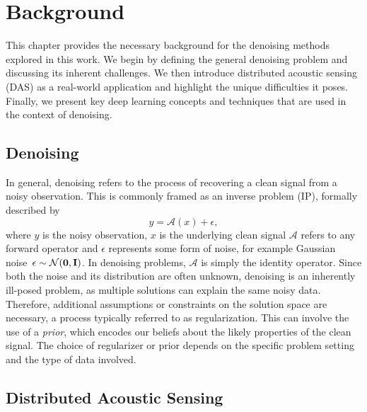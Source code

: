 \chapter{Background}

This chapter provides the necessary background for the denoising methods explored in this work.
We begin by defining the general denoising problem and discussing its inherent challenges.
We then introduce distributed acoustic sensing (DAS) as a real-world application and highlight the unique difficulties it poses.
Finally, we present key deep learning concepts and techniques that are used in the context of denoising.

\section{Denoising}\label{sec:denoising}

In general, denoising refers to the process of recovering a clean signal from a noisy observation.
This is commonly framed as an inverse problem (IP), formally described by
\begin{equation}
    y = \mathcal{A}(x) + \epsilon,
\end{equation}
where $y$ is the noisy observation, $x$ is the underlying clean signal $\mathcal{A}$ refers to any forward operator and $\epsilon$ represents some form of noise, for example Gaussian noise~$\epsilon \sim \mathcal{N}(\mathbf{0},\mathbf{I})$.
In denoising problems, $\mathcal{A}$ is simply the identity operator.
Since both the noise and its distribution are often unknown, denoising is an inherently ill-posed problem, as multiple solutions can explain the same noisy data.
Therefore, additional assumptions or constraints on the solution space are necessary, a process typically referred to as regularization.
This can involve the use of a \textit{prior}, which encodes our beliefs about the likely properties of the clean signal.
The choice of regularizer or prior depends on the specific problem setting and the type of data involved.

\section{Distributed Acoustic Sensing}\label{sec:DAS}

